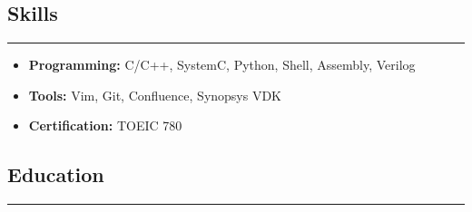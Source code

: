\documentclass[11pt,letterpaper]{article}
\makeatletter
\newcommand{\headerrow}[2]
{\begin{tabular*}{\linewidth}{l@{\extracolsep{\fill}}r}
#1 &
#2 \\
\end{tabular*}}
\makeatother
\begin{document}
\begin{itemize}[leftmargin=1em]
	      	      
\end{itemize}
\subsection*{\Large Skills}
\hrule
\vspace{1em}

\begin{itemize}[leftmargin=1em,noitemsep]
	\item \textbf{Programming:}
	      C/C++, SystemC, Python, Shell, Assembly, Verilog
	\item \textbf{Tools:}
	       Vim, Git, Confluence, Synopsys VDK
    \item \textbf{Certification:}
            TOEIC 780
          
\end{itemize}
\subsection*{\Large Education}
\hrule
\vspace{1em}
\end{document}
